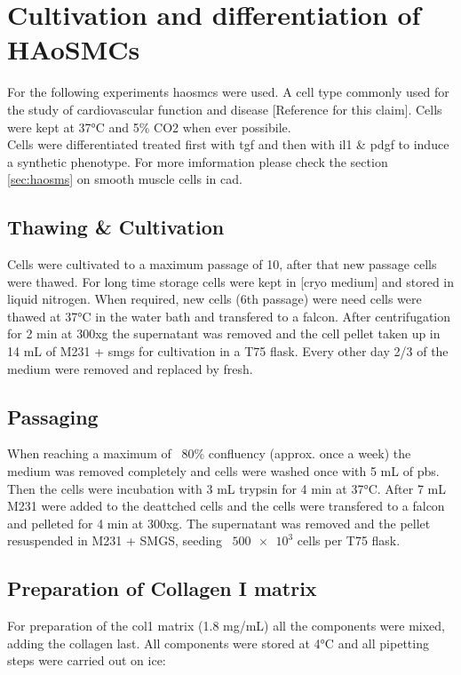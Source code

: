 \section{Cultivation and differentiation of HAoSMCs}
\label{sec:cultivation}
For the following experiments \acp{haosmc} were used. A cell type commonly used for the study of cardiovascular function and disease [Reference for this claim]. Cells were kept at 37°C and 5\% CO2 when ever possibile.\\
Cells were differentiated treated first with \ac{tgf} and then with \ac{il1} \& \ac{pdgf} to induce a synthetic phenotype. For more imformation please check the section \ref{sec:haosms} on smooth muscle cells in \ac{cad}.

    \subsection{Thawing \& Cultivation}
    Cells were cultivated to a maximum passage of 10, after that new passage cells were thawed. For long time storage cells were kept in [cryo medium] and stored in liquid nitrogen. When required, new cells (6th passage) were need cells were thawed at 37°C in the water bath and transfered to a falcon. After centrifugation for 2 min at 300xg the supernatant was removed and the cell pellet taken up in 14 mL of M231 + \ac{smgs} for cultivation in a T75 flask. Every other day 2/3 of the medium were removed and replaced by fresh.

    \subsection{Passaging}
    When reaching a maximum of ~80\% confluency (approx. once a week) the medium was removed completely and cells were washed once with 5 mL of \ac{pbs}. Then the cells were incubation with 3 mL trypsin for 4 min at 37°C. After 7 mL M231 were added to the deattched cells and the cells were transfered to a falcon and pelleted for 4 min at 300xg. The supernatant was removed and the pellet resuspended in M231 + SMGS, seeding ~$\num{500e3}$ cells per T75 flask.

    \subsection{Preparation of Collagen I matrix}
    For preparation of the \ac{col1} matrix (1.8 mg/mL) all the components were mixed, adding the collagen last. All components were stored at 4°C and all pipetting steps were carried out on ice:

